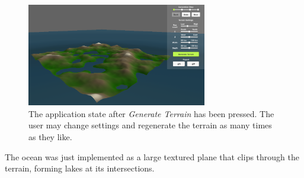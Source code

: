 \begin{figure}[H]
  \centering

  \includegraphics[width=0.7\textwidth]{figure/terrain_generated.png}
  \caption{The application state after \textit{Generate Terrain} has been pressed. The user may change settings and regenerate the terrain as many times as they like.}

  \label{fig:terr}
\end{figure}

The ocean was just implemented as a large textured plane that clips through the terrain, forming lakes at its intersections.

